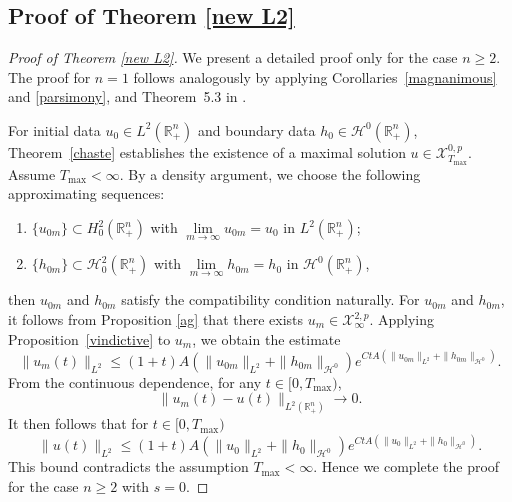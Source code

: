 \documentclass[preprint,compress,12pt]{elsarticle}
\numberwithin{equation}{section}
\begin{document}
\subsection{Proof of Theorem \ref{new L2}}

\begin{proof}[Proof of Theorem \ref{new L2}]
We present a detailed proof only for the case  $n\geq2$. The proof for $n=1$ follows analogously by applying Corollaries~\ref{magnanimous} and \ref{parsimony}, and Theorem~5.3 in \cite{figment}.

For  initial data $u_0 \in L^2(\mathbb{R}_+^n)$ and   boundary data $h_0 \in \mathcal{H}^0(\mathbb{R}^{n}_{+})$, Theorem~\ref{chaste}   establishes the existence of a maximal solution $u\in\mathscr{X}^{0,p}_{T_{\max}}$. Assume $T_{\max}<\infty$. By a density argument, we choose the following approximating sequences:
	\begin{enumerate}[label=(\roman*)]
		\item $\{u_{0m}\} \subset H_{0}^2(\mathbb{R}_+^n)$ with $\lim\limits_{m\to\infty} u_{0m} = u_0$ in $L^{2}(\mathbb{R}_+^n)$;
		\item $\{h_{0m}\} \subset \mathcal{H}_{0}^2(\mathbb{R}^{n}_{+})$ with $\lim\limits_{m\to\infty} h_{0m} = h_0$ in $\mathcal{H}^0(\mathbb{R}^{n}_{+})$,
	\end{enumerate}
	then $u_{0m}$ and $h_{0m}$ satisfy the compatibility condition naturally. For $u_{0m}$ and $h_{0m}$, it follows from Proposition \ref{ag} that there exists $u_{m}\in \mathscr{X}^{2,p}_{\infty}$. Applying Proposition~\ref{vindictive} to $u_{m}$, we obtain the estimate
	\begin{equation}
		\|u_{m}(t)\|_{L^{2}}\leq (1+t) A\left(\|u_{0m}\|_{L^{2}}+\|h_{0m}\|_{\mathcal{H}^{0}}\right) e^{CtA\left(\|u_{0m}\|_{L^{2}}+\|h_{0m}\|_{\mathcal{H}^{0}}\right)}.
	\end{equation}
	From the continuous dependence, for any $t\in[0,T_{\max})$,  $$\|u_{m}(t)-u(t)\|_{L^{2}(\mathbb{R}^{n}_{+})}\rightarrow0.$$ It then follows that for $t\in[0,T_{\max})$
	\begin{equation}
		\|u(t)\|_{L^{2}}\leq (1+t) A\left(\|u_{0}\|_{L^{2}}+\|h_{0}\|_{\mathcal{H}^{0}}\right) e^{CtA\left(\|u_{0}\|_{L^{2}}+\|h_{0}\|_{\mathcal{H}^{0}}\right)}.
	\end{equation}
	This bound contradicts the assumption $T_{\max}<\infty$. Hence we complete the proof for the case $n\geq2$ with $s=0$.
	

\end{proof}
\end{document}
